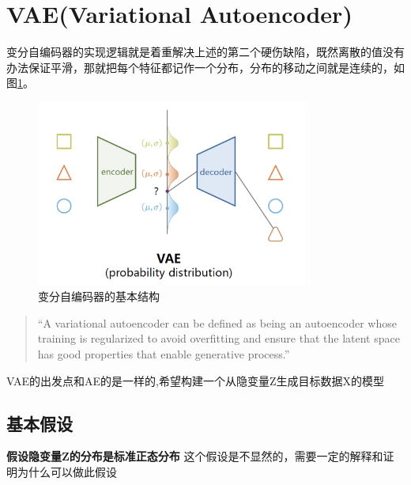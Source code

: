 \section{VAE(Variational Autoencoder)}
变分自编码器的实现逻辑就是着重解决上述的第二个硬伤缺陷，既然离散的值没有办法保证平滑，那就把每个特征都记作一个分布，分布的移动之间就是连续的，如图\ref{fig:vae}。

\begin{figure}[htbp]
    \centering
    \includegraphics[width=0.8\textwidth]{figures/chapter2/vae.png}
    \caption{变分自编码器的基本结构}
    \label{fig:vae}
\end{figure}
\begin{quotation}
    “A variational autoencoder can be defined as being an autoencoder whose training is regularized to avoid overfitting and ensure that the latent space has good properties that enable generative process.”
\end{quotation}
VAE的出发点和AE的是一样的,希望构建一个从隐变量Z生成目标数据X的模型

\subsection{基本假设}
\textbf{假设隐变量Z的分布是标准正态分布} \newline
这个假设是不显然的，需要一定的解释和证明为什么可以做此假设

